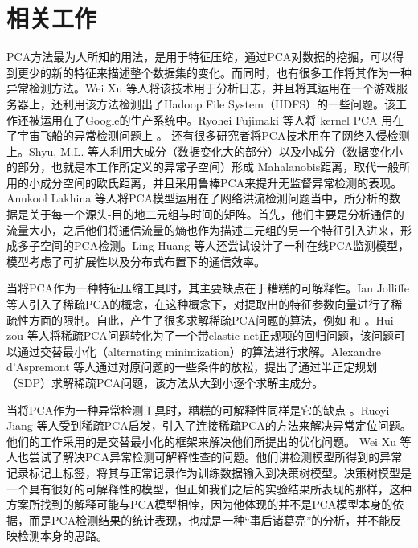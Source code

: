\chapter{相关工作}
PCA方法最为人所知的用法，是用于特征压缩\cite{jolliffe2002principal}，通过PCA对数据的挖掘，可以得到更少的新的特征来描述整个数据集的变化。而同时，也有很多工作将其作为一种异常检测方法\cite{dunia1997multi,Anomaly-Survey-09}。Wei Xu 等人将该技术用于分析日志，并且将其运用在一个游戏服务器上，还利用该方法检测出了Hadoop File System（HDFS）的一些问题\cite{XuWei-SOSP}。该工作还被运用在了Google的生产系统中\cite{XuWeiGoogle}。Ryohei Fujimaki 等人将 kernel PCA 用在了宇宙飞船的异常检测问题上 \cite{kernelPCA-Space}。
还有很多研究者将PCA技术用在了网络入侵检测上\cite{Lakhina-2005-sigcomm,Lakhina-2004-sigcomm,jiang2013family,PCA-KDD99-2006}。Shyu, M.L. 等人利用大成分（数据变化大的部分）以及小成分（数据变化小的部分，也就是本工作所定义的异常子空间）形成 Mahalanobis距离，取代一般所用的小成分空间的欧氏距离，并且采用鲁棒PCA来提升无监督异常检测的表现\cite{shyu2003novel}。Anukool Lakhina 等人将PCA模型运用在了网络洪流检测问题当中，所分析的数据是关于每一个源头-目的地二元组与时间的矩阵\cite{Lakhina-2005-sigcomm,Lakhina-2004-sigcomm}。首先，他们主要是分析通信的流量大小\cite{Lakhina-2004-sigcomm}，之后他们将通信流量的熵也作为描述二元组的另一个特征引入进来，形成多子空间的PCA检测\cite{Lakhina-2005-sigcomm}。Ling Huang 等人还尝试设计了一种在线PCA监测模型，模型考虑了可扩展性以及分布式布置下的通信效率\cite{huang2006network,INFOCOM-Distributed-PCA}。

当将PCA作为一种特征压缩工具时，其主要缺点在于糟糕的可解释性。Ian Jolliffe 等人引入了稀疏PCA的概念，在这种概念下，对提取出的特征参数向量进行了稀疏性方面的限制\cite{SPCA-2003}。自此，产生了很多求解稀疏PCA问题的算法，例如 \cite{SPCA-2006} 和 \cite{SPCA-SDP}。Hui zou 等人将稀疏PCA问题转化为了一个带elastic net正规项的回归问题，该问题可以通过交替最小化（alternating minimization）的算法进行求解\cite{SPCA-2006}。Alexandre d'Aspremont 等人通过对原问题的一些条件的放松，提出了通过半正定规划（SDP）求解稀疏PCA问题，该方法从大到小逐个求解主成分\cite{SPCA-SDP}。

当将PCA作为一种异常检测工具时，糟糕的可解释性同样是它的缺点 \cite{PCA-Sensitivity,XuWei-SOSP}。Ruoyi Jiang 等人受到稀疏PCA启发，引入了连接稀疏PCA的方法来解决异常定位问题\cite{jiang2011JSPCA,jiang2013family}。他们的工作采用的是交替最小化的框架\cite{SPCA-2006}来解决他们所提出的优化问题。 Wei Xu 等人也尝试了解决PCA异常检测可解释性查的问题。他们讲检测模型所得到的异常记录标记上标签，将其与正常记录作为训练数据输入到决策树模型。决策树模型是一个具有很好的可解释性的模型，但正如我们之后的实验结果所表现的那样，这种方案所找到的解释可能与PCA模型相悖，因为他体现的并不是PCA模型本身的依据，而是PCA检测结果的统计表现，也就是一种“事后诸葛亮”的分析，并不能反映检测本身的思路。
